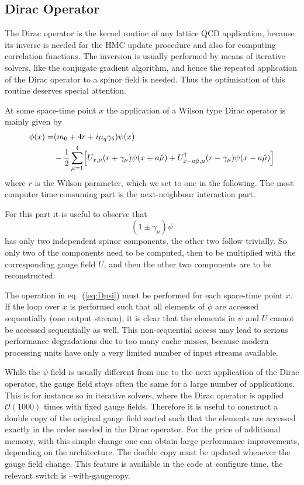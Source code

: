 \subsection{Dirac Operator}
\label{sec:dirac}

The Dirac operator is the kernel routine of any lattice QCD
application, because its inverse is needed for the HMC update
procedure and also for computing correlation functions. The inversion
is usually performed by means of iterative solvers, like the conjugate
gradient algorithm, and hence the repeated application of the Dirac
operator to a spinor field is needed. Thus the optimisation of this
routine deserves special attention.

At some space-time point $x$ the application of a Wilson type Dirac
operator is mainly given by
\begin{equation}
  \label{eq:Dpsi}
  \begin{split}
    \phi(x) = & (m_0 + 4r +i\mu_q\gamma_5)\psi(x) \\
    &- \frac{1}{2}\sum_{\mu = 1}^4\Bigl[
    U_{x,\mu}(r+\gamma_\mu) \psi(x+a\hat\mu)  + U^\dagger_{x-a\hat\mu,\mu}
    (r-\gamma_\mu)\psi(x-a\hat\mu)\Bigr] \\
  \end{split}
\end{equation}
where $r$ is the Wilson parameter, which we set to one in the
following. The most computer time consuming part is the next-neighbour
interaction part.

For this part it is useful to observe that 
\[
(1\pm \gamma_\mu)\psi
\]
has only two independent spinor components, the other two follow
trivially. So only two of the components need to be computed, then
to be 
multiplied with the corresponding gauge field $U$, and then the other
two components are to be reconstructed.

The operation in eq.~(\ref{eq:Dpsi}) must be performed for each space-time
point $x$. If the loop over $x$ is performed such that all elements
of $\phi$ are accessed sequentially (one output stream), it is clear
that the elements in $\psi$ and $U$ cannot be accessed sequentially as
well. This non-sequential access may lead to serious performance
degradations due to too many cache misses, because modern processing
units have only a very limited number of input streams available. 

While the $\psi$  field is usually different from
one to the next application of the Dirac operator, the gauge field
stays often the same for a large number of applications. This is for
instance so in iterative solvers, where the Dirac operator is applied
$\mathcal{O}(1000)$ times with fixed gauge fields. Therefore it is
useful to construct a double copy of the original gauge field sorted
such that the elements are accessed exactly in the order needed in the
Dirac operator. For the price of additional memory, with this simple
change one can obtain large performance improvements, depending on the
architecture. The double copy must be updated whenever the gauge field
change. This feature is available in the code at configure time, the
relevant switch is {\ttfamily --with-gaugecopy}.

